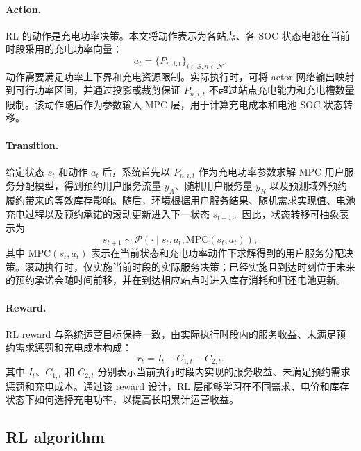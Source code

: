 \documentclass[12pt,hyperref,a4paper,UTF8]{ctexart}
\begin{document}
\paragraph{Action.}
RL 的动作是充电功率决策。本文将动作表示为各站点、各 SOC 状态电池在当前时段采用的充电功率向量：
\begin{equation}
a_t=
\{P_{n,i,t}\}_{i\in\mathcal{S},n\in\mathcal{N}}.
\label{eq:rl_action}
\end{equation}
动作需要满足功率上下界和充电资源限制。实际执行时，可将 actor 网络输出映射到可行功率区间，并通过投影或裁剪保证 $P_{n,i,t}$ 不超过站点充电能力和充电槽数量限制。该动作随后作为参数输入 MPC 层，用于计算充电成本和电池 SOC 状态转移。

\paragraph{Transition.}
给定状态 $s_t$ 和动作 $a_t$ 后，系统首先以 $P_{n,i,t}$ 作为充电功率参数求解 MPC 用户服务分配模型，得到预约用户服务流量 $y_A$、随机用户服务量 $y_R$ 以及预测域外预约履约带来的等效库存影响。随后，环境根据用户服务结果、随机需求实现值、电池充电过程以及预约承诺的滚动更新进入下一状态 $s_{t+1}$。因此，状态转移可抽象表示为
\begin{equation}
s_{t+1}\sim \mathcal{P}(\cdot\mid s_t,a_t,\mathrm{MPC}(s_t,a_t)),
\label{eq:rl_transition}
\end{equation}
其中 $\mathrm{MPC}(s_t,a_t)$ 表示在当前状态和充电功率动作下求解得到的用户服务分配决策。滚动执行时，仅实施当前时段的实际服务决策；已经实施且到达时刻位于未来的预约承诺会随时间前移，并在到达相应站点时进入库存消耗和归还电池更新。

\paragraph{Reward.}
RL reward 与系统运营目标保持一致，由实际执行时段内的服务收益、未满足预约需求惩罚和充电成本构成：
\begin{equation}
r_t=I_t-C_{1,t}-C_{2,t}.
\label{eq:rl_reward}
\end{equation}
其中 $I_t$、$C_{1,t}$ 和 $C_{2,t}$ 分别表示当前执行时段内实现的服务收益、未满足预约需求惩罚和充电成本。通过该 reward 设计，RL 层能够学习在不同需求、电价和库存状态下如何选择充电功率，以提高长期累计运营收益。

\subsection{RL algorithm}
\end{document}
